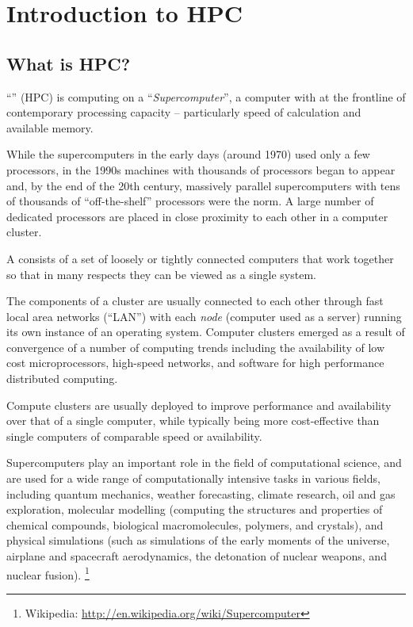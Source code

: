 \chapter{Introduction to HPC}
\label{ch:introduction-to-hpc}

\section{What is HPC?}
\label{sec:what-is-hpc}

``'' (HPC) is computing on a
``\emph{Supercomputer}'', a computer with at the frontline of contemporary
processing capacity -- particularly speed of calculation and available memory.

While the supercomputers in the early days (around 1970) used only a few
processors, in the 1990s machines with thousands of processors began to appear
and, by the end of the 20th century, massively parallel supercomputers with
tens of thousands of ``off-the-shelf'' processors were the norm. A large number
of dedicated processors are placed in close proximity to each other in a
computer cluster.

A  consists of a set of loosely or tightly connected
computers that work together so that in many respects they can be viewed as a
single system.

The components of a cluster are usually connected to each other through fast
local area networks (``LAN'') with each \emph{node} (computer used as a
server) running its own instance of an operating system. Computer clusters
emerged as a result of convergence of a number of computing trends including
the availability of low cost microprocessors, high-speed networks, and software
for high performance distributed computing.

Compute clusters are usually deployed to improve performance and availability
over that of a single computer, while typically being more cost-effective
than single computers of comparable speed or availability.

Supercomputers play an important role in the field of computational science,
and are used for a wide range of computationally intensive tasks in various
fields, including quantum mechanics, weather forecasting, climate research, oil
and gas exploration, molecular modelling (computing the structures and
properties of chemical compounds, biological macromolecules, polymers, and
crystals), and physical simulations (such as simulations of the early moments
of the universe, airplane and spacecraft aerodynamics, the detonation of
nuclear weapons, and nuclear fusion).%
\footnote{Wikipedia: \url{http://en.wikipedia.org/wiki/Supercomputer}}

